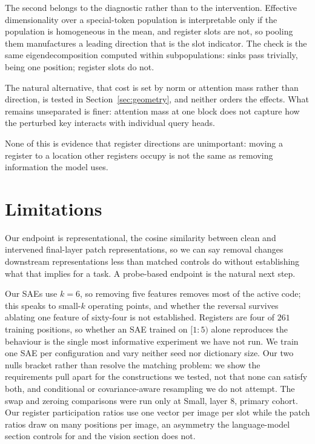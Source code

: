 \documentclass{article}
\begin{document}
The second belongs to the diagnostic rather than to the intervention. Effective dimensionality over a special-token population is interpretable only if the population is homogeneous in the mean, and register slots are not, so pooling them manufactures a leading direction that is the slot indicator. The check is the same eigendecomposition computed within subpopulations: sinks pass trivially, being one position; register slots do not.

The natural alternative, that cost is set by norm or attention mass rather than direction, is tested in Section~\ref{sec:geometry}, and neither orders the effects. What remains unseparated is finer: attention mass at one block does not capture how the perturbed key interacts with individual query heads.

None of this is evidence that register directions are unimportant: moving a register to a location other registers occupy is not the same as removing information the model uses.

\section{Limitations}
\label{sec:limitations}

Our endpoint is representational, the cosine similarity between clean and intervened final-layer patch representations, so we can say removal changes downstream representations less than matched controls do without establishing what that implies for a task. A probe-based endpoint is the natural next step.

Our SAEs use $k=6$, so removing five features removes most of the active code; this speaks to small-$k$ operating points, and whether the reversal survives ablating one feature of sixty-four is not established. Registers are four of $261$ training positions, so whether an SAE trained on $[1{:}5)$ alone reproduces the behaviour is the single most informative experiment we have not run. We train one SAE per configuration and vary neither seed nor dictionary size. Our two nulls bracket rather than resolve the matching problem: we show the requirements pull apart for the constructions we tested, not that none can satisfy both, and conditional or covariance-aware resampling we do not attempt. The swap and zeroing comparisons were run only at Small, layer 8, primary cohort. Our register participation ratios use one vector per image per slot while the patch ratios draw on many positions per image, an asymmetry the language-model section controls for and the vision section does not.
\end{document}

